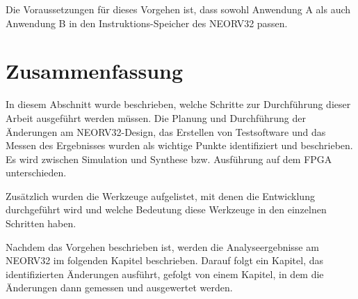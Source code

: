 Die Voraussetzungen für dieses Vorgehen ist, dass sowohl Anwendung A als auch Anwendung B in den Instruktions-Speicher des NEORV32 passen.




\section{Zusammenfassung} \label{sec:process_summary}

In diesem Abschnitt wurde beschrieben, welche Schritte zur Durchführung dieser Arbeit ausgeführt werden müssen. Die Planung und Durchführung der Änderungen am NEORV32-Design, das Erstellen von Testsoftware und das Messen des Ergebnisses wurden als wichtige Punkte identifiziert und beschrieben. Es wird zwischen Simulation und Synthese bzw. Ausführung auf dem FPGA unterschieden.

Zusätzlich wurden die Werkzeuge aufgelistet, mit denen die Entwicklung durchgeführt wird und welche Bedeutung diese Werkzeuge in den einzelnen Schritten haben.

Nachdem das Vorgehen beschrieben ist, werden die Analyseergebnisse am NEORV32 im folgenden Kapitel beschrieben. Darauf folgt ein Kapitel, das identifizierten Änderungen ausführt, gefolgt von einem Kapitel, in dem die Änderungen dann gemessen und ausgewertet werden.